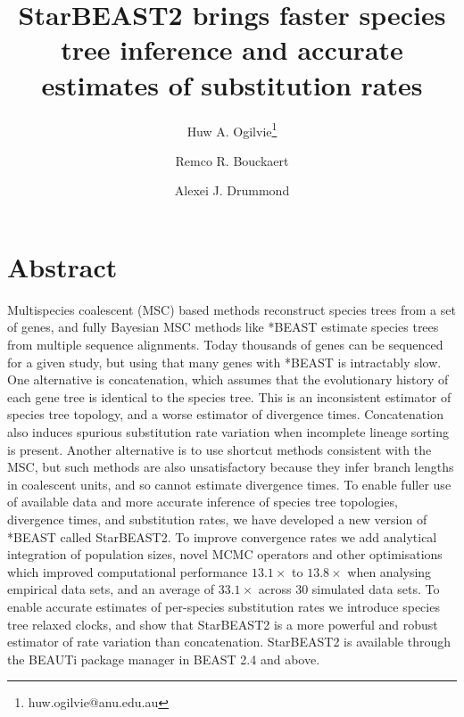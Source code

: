 \documentclass[12pt]{article}
\begin{document}
\title{StarBEAST2 brings faster species tree inference and accurate estimates of substitution rates}
\author[1,2]{Huw A. Ogilvie\thanks{huw.ogilvie@anu.edu.au}}
\author[2,3]{Remco R. Bouckaert}
\author[2,3]{Alexei J. Drummond}

\maketitle

\clearpage

\justifying

\section*{Abstract}

Multispecies coalescent (MSC) based methods reconstruct species trees from a set of
genes, and fully Bayesian MSC methods like *BEAST estimate species trees from
multiple sequence alignments. Today thousands of genes can be sequenced for a
given study, but using that many genes with *BEAST is intractably slow. One
alternative is concatenation, which assumes that the evolutionary history of
each gene tree is identical to the species tree. This is an inconsistent
estimator of species tree topology, and a worse estimator of divergence times.
Concatenation also induces spurious substitution rate variation when
incomplete lineage sorting is present. Another alternative is to use shortcut methods consistent with the MSC, but such methods are also unsatisfactory because they
infer branch lengths in coalescent units, and so cannot estimate divergence
times. To enable fuller use of available data and more accurate inference of
species tree topologies, divergence times, and substitution rates, we have
developed a new version of *BEAST called StarBEAST2. To improve convergence
rates we add analytical integration of population sizes, novel MCMC operators
and other optimisations which improved computational performance
$13.1\times$ to $13.8\times$ when analysing empirical data sets, and an average of
$33.1\times$ across 30 simulated data sets. To enable accurate estimates of
per-species substitution rates we introduce species tree relaxed clocks, and
show that StarBEAST2 is a more powerful and robust estimator of rate variation
than concatenation. StarBEAST2 is available through the BEAUTi package manager
in BEAST 2.4 and above.
\end{document}
